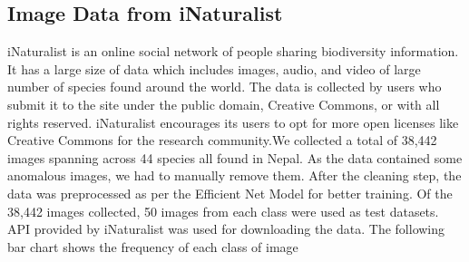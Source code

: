\documentclass[fleqn, 10pt, twoside]{IOEGC}
\begin{document}
\subsection{Image Data from iNaturalist}
iNaturalist is an online social network of people sharing biodiversity information. It has a large size of data which includes images, audio, and video of large number of species found around the world. The data is collected by users who submit it to the site under the public domain, Creative Commons, or with all rights reserved. iNaturalist encourages its users to opt for more open licenses like Creative Commons for the research community.We collected a total of 38,442 images spanning across 44 species all found in Nepal. As the data contained some anomalous images, we had to manually remove them. After the cleaning step, the data was preprocessed as per the Efficient Net Model for better training. Of the 38,442 images collected, 50 images from each class were used as test datasets.
API provided by iNaturalist was used for downloading the data. The following bar chart shows the frequency of each class of image
\end{document}
